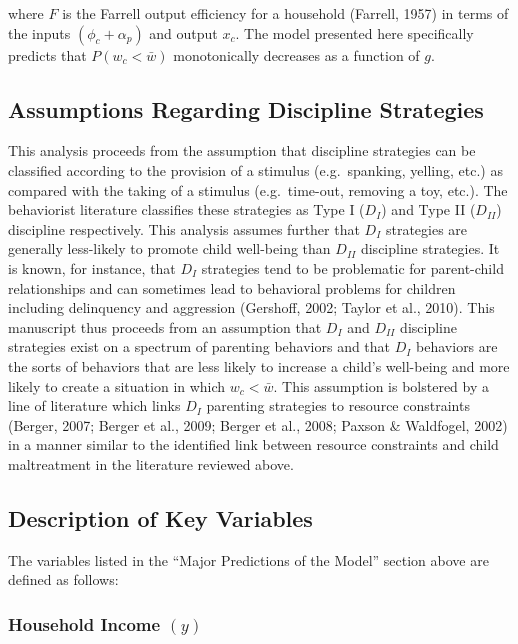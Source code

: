 \documentclass[review]{elsarticle}\usepackage[]{graphicx}\usepackage[]{color}
\begin{document}
where $F$ is the Farrell output efficiency for a household (Farrell,
1957) in terms of the inputs $(\phi_c + \alpha_p)$ and output $x_c$. The
model presented here specifically predicts that $P(w_c < \bar{w})$
monotonically decreases as a function of $g$.

\subsection{Assumptions Regarding Discipline
Strategies}\label{assumptions-regarding-discipline-strategies}

This analysis proceeds from the assumption that discipline strategies
can be classified according to the provision of a stimulus
(e.g.~spanking, yelling, etc.) as compared with the taking of a stimulus
(e.g.~time-out, removing a toy, etc.). The behaviorist literature
classifies these strategies as Type I ($D_I$) and Type II ($D_{II}$)
discipline respectively. This analysis assumes further that $D_I$
strategies are generally less-likely to promote child well-being than
$D_{II}$ discipline strategies. It is known, for instance, that $D_I$
strategies tend to be problematic for parent-child relationships and can
sometimes lead to behavioral problems for children including delinquency
and aggression (Gershoff, 2002; Taylor et al., 2010). This manuscript
thus proceeds from an assumption that $D_I$ and $D_{II}$ discipline
strategies exist on a spectrum of parenting behaviors and that $D_I$
behaviors are the sorts of behaviors that are less likely to increase a
child's well-being and more likely to create a situation in which
$w_c < \bar{w}$. This assumption is bolstered by a line of literature
which links $D_I$ parenting strategies to resource constraints (Berger, 2007; Berger et al., 2009; Berger et al., 2008; Paxson
\& Waldfogel, 2002) in a manner similar to the identified link between
resource constraints and child maltreatment in the literature reviewed
above.

\subsection{Description of Key
Variables}\label{description-of-key-variables}

The variables listed in the ``Major Predictions of the Model'' section
above are defined as follows:

\subsubsection{Household Income $(y)$}\label{household-income-y}
\end{document}
